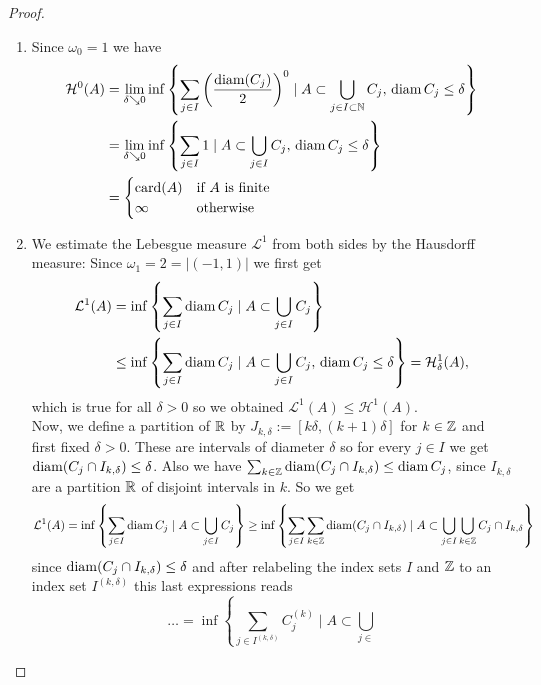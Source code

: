 \begin{proof}~
\begin{enumerate}[(1)]
\item Since $\omega_0 = 1$ we have 
\[
\begin{aligned}
\mathcal{H}^0(A) &= \lim_{\delta \searrow 0} \inf \left\{ \sum_{j\in I}
\left(\frac{\operatorname{diam}(C_j)}{2}\right)^0 \mid A \subset \bigcup_{j\in I \subset \mathbb{N}}
C_j, \,
\operatorname{diam} C_j \leq \delta  \right\} 
\\& =
\lim_{\delta \searrow 0} \inf \left\{ \sum_{j\in I}
1 \mid A \subset \bigcup_{j\in I} C_j,\,
\operatorname{diam} C_j \leq \delta  \right\} 
\\&=
\begin{cases}
\text{card}(A) & \text{if $A$ is finite}
\\
\infty & \text{otherwise}
\end{cases}
\end{aligned}
\]
\item We estimate the Lebesgue measure $\mathcal{L}^1$ from both sides by the
Hausdorff measure: Since $\omega_1 = 2 = |(-1,1)|$ we first get 
\[
\begin{aligned}
\mathcal{L}^1(A) 
&= \inf \left\{ \sum_{j\in I} \operatorname{diam} C_j \mid A \subset \bigcup_{j\in I} C_j \right\}
\\ & \leq 
\inf \left\{ \sum_{j\in I} \operatorname{diam} C_j \mid A \subset \bigcup_{j\in I} C_j, \,
\operatorname{diam} C_j \leq \delta \right\}
= 
\mathcal{H}^1_\delta(A),
\end{aligned}
\]
which is true for all $\delta > 0$ so we obtained $\mathcal{L}^1(A) \leq
\mathcal{H}^1(A)$.
\\
Now, we define a partition of $\mathbb{R}$ by $J_{k,\delta} := [k\delta, (k+1)\delta]$
for $k \in \mathbb{Z}$ and first fixed $\delta >0$. These are intervals of diameter
$\delta$ so for every $j \in I$ we get $\operatorname{diam}(C_j \cap I_{k,\delta}) \leq
\delta$. Also we have $\sum_{k\in\mathbb{Z}} \operatorname{diam}(C_j \cap I_{k,\delta}) \leq \operatorname{diam} C_j$,
since $I_{k,\delta}$ are a partition $\mathbb{R}$ of disjoint intervals in $k$. So we
get
\[
\begin{aligned}
\mathcal{L}^1(A) = \inf \left\{ \sum_{j\in I} \operatorname{diam} C_j \mid A \subset
\bigcup_{j\in I} C_j \right\}
\geq \inf \left\{ \sum_{j\in I} \sum_{k\in\mathbb{Z}} \operatorname{diam} (C_j \cap I_{k,\delta}) \mid A \subset
\bigcup_{j\in I} \bigcup_{k\in\mathbb{Z}} C_j\cap I_{k,\delta} \right\}
\end{aligned}
\]
since $\operatorname{diam} (C_j \cap I_{k,\delta} ) \leq \delta$ and after relabeling the
index sets $I$ and $\mathbb{Z}$ to an index set $I^{(k,\delta)}$ this last expressions reads 
\[
\dots = \inf \left\{ \sum_{j \in I^{(k,\delta)}} C_j^{(k)} \mid A \subset \bigcup_{j \in
}\]
\end{enumerate}
\end{proof}
